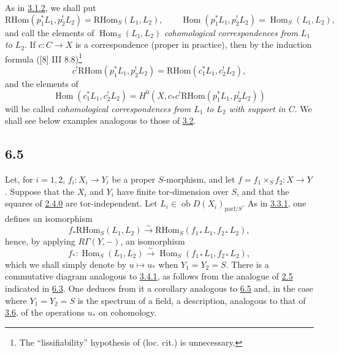 \documentclass[11pt]{article}
\DeclareMathOperator{\Hom}{Hom}
\providecommand{\RHom}{\mathrm{RHom}}
\providecommand{\RHom}{\mathrm{RHom}}
\providecommand{\Hom}{\operatorname{Hom}}
\providecommand{\RHom}{\mathrm R\mathcal{H}om}
\providecommand{\RHom}{\mathrm{RHom}}
\providecommand{\Hom}{\operatorname{Hom}}
\begin{document}
As in \hyperref[sga5:III:equation:3.1.2]{3.1.2}, we shall put
\begin{equation}
\tag{6.4.3}\label{sga5:III:equation:6.4.3}
\RHom(p_1^*L_1,p_2^!L_2)=\RHom_S(L_1,L_2),\qquad
\Hom(p_1^*L_1,p_2^!L_2)=\Hom_S(L_1,L_2),
\end{equation}
and call the elements of $\Hom_S(L_1,L_2)$ \emph{cohomological correspondences from $L_1$ to $L_2$}. If $c:C\to X$ is a correspondence (proper in practice), then by the induction formula ([8] III 8.8)\footnote{The ``lissifiability'' hypothesis of (loc. cit.) is unnecessary.}
\begin{equation}
\tag{6.4.4}\label{sga5:III:equation:6.4.4}
c^!\RHom(p_1^*L_1,p_2^!L_2)=\RHom(c_1^*L_1,c_2^!L_2),
\end{equation}
and the elements of
\[
\Hom(c_1^*L_1,c_2^!L_2)=H^0(X,c_*c^!\RHom(p_1^*L_1,p_2^!L_2))
\]
will be called \emph{cohomological correspondences from $L_1$ to $L_2$ with support in $C$}. We shall see below examples analogous to those of \hyperref[sga5:III:subsection:3.2]{3.2}.

\subsection*{6.5}\label{sga5:III:subsection:6.5}
Let, for $i=1,2$, $f_i:X_i\to Y_i$ be a proper $S$-morphism, and let $f=f_1\times_Sf_2:X\to Y$. Suppose that the $X_i$ and $Y_i$ have finite tor-dimension over $S$, and that the squares of \hyperref[sga5:III:equation:2.4.0]{2.4.0} are tor-independent. Let $L_i\in\operatorname{ob}D(X_i)_{\mathrm{parf}/S}$. As in \hyperref[sga5:III:equation:3.3.1]{3.3.1}, one defines an isomorphism
\begin{equation}
\tag{6.5.1}\label{sga5:III:equation:6.5.1}
f_*\RHom_S(L_1,L_2)\xrightarrow{\sim}\RHom_S(f_{1*}L_1,f_{2*}L_2),
\end{equation}
hence, by applying $R\Gamma(Y,-)$, an isomorphism
\begin{equation}
\tag{6.5.2}\label{sga5:III:equation:6.5.2}
f_*:\Hom_S(L_1,L_2)\xrightarrow{\sim}\Hom_S(f_{1*}L_1,f_{2*}L_2),
\end{equation}
which we shall simply denote by $u\mapsto u_*$ when $Y_1=Y_2=S$. There is a commutative diagram analogous to \hyperref[sga5:III:equation:3.4.1]{3.4.1}, as follows from the analogue of \hyperref[sga5:III:proposition:2.5]{2.5} indicated in \hyperref[sga5:III:subsection:6.3]{6.3}. One deduces from it a corollary analogous to \hyperref[sga5:III:subsection:6.5]{6.5} and, in the case where $Y_1=Y_2=S$ is the spectrum of a field, a description, analogous to that of \hyperref[sga5:III:subsection:3.6]{3.6}, of the operations $u_*$ on cohomology.
\end{document}

